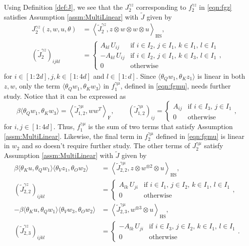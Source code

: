 \documentclass{article}
\begin{document}
\begin{appendices}
Using Definition \ref{def:J}, we see that the $J^{\gamma z}_2$ corresponding to $f^{\gamma z}_2$ in \eqref{eqn:fgz} satisfies Assumption \ref{assm:MultiLinear} with $\widetilde{J}$ given by
\begin{align*}
J^{\gamma z}_2(z,w,u,\theta) &= \left\langle \widetilde{J}_2^{\gamma z} ,z\otimes w\otimes w\otimes u\right\rangle_\mathrm{HS},\\ (\widetilde{J}_2^{\gamma z})_{ijkl} &= \begin{cases}
    A_{kl}\, U_{ij} & \text{if }i\in I_2,\, j\in I_1, \,k\in I_1,\, l\in I_1\\
    -A_{kl}\, U_{ij} & \text{if }i\in I_2,\, j\in I_1,\, k\in I_3,\, l\in I_1\\
    0 & \text{otherwise}
\end{cases},
\end{align*}
for $i\in[1:2d],j,k\in[1:4d]$ and $l\in[1:d]$. Since $\langle \theta_Q w_1,\theta_K z_1\rangle$ is linear in both $z,w$, only the term  $\langle \theta_Q w_1,\theta_Kw_3\rangle$ in $f_1^{\gamma\mu}$, defined in \eqref{eqn:fgmu}, needs further study. Notice that it can be expressed as 
\[
\beta\langle \theta_Q w_1,\theta_Kw_3\rangle = \left\langle \widetilde{J}^{\gamma\mu}_{1,2}, w w^T \right\rangle_\mathrm{F}, \qquad (\widetilde{J}_{1,2}^{\gamma \mu})_{ij} = \begin{cases}
    A_{ij} &\text{if }i\in I_3,\, j \in I_1\\
    0 & \text{otherwise}
\end{cases},
\]
for $i,j\in[1:4d]$. Thus, $f_1^{\gamma\mu}$ is the sum of two terms that satisfy Assumption \ref{assm:MultiLinear}. Likewise, the final term in $f_2^{\gamma\mu}$ defined in \eqref{eqn:fgmu} is linear in $w_2$ and so doesn't require further study. The other terms of $J_2^{\gamma\mu}$ satisfy Assumption \ref{assm:MultiLinear} with $\widetilde{J}$ given by 
\begin{align*}
        \beta\langle \theta_K u,\theta_Q w_1\rangle\langle \theta_V z_1, \theta_O w_2 \rangle &= \left\langle \widetilde{J}^{\gamma\mu}_{2,2}, z\otimes w^{\otimes 2}\otimes u\right\rangle_{\mathrm{HS}},\\ (\widetilde{J}_{2,2}^{\gamma z})_{ijkl} &= \begin{cases}
    A_{lk}\, U_{ji} & \text{if } i\in I_1,\, j\in I_2,\, k\in I_1,\, l\in I_1\\
    0 & \text{otherwise}
\end{cases},\\
        -\beta\langle \theta_K u,\theta_Q w_1\rangle\langle \theta_V w_3, \theta_O w_2 \rangle &= \left\langle \widetilde{J}^{\gamma\mu}_{2,3}, w^{\otimes 3}\otimes u\right\rangle_{\mathrm{HS}},\\ (\widetilde{J}_{2,3}^{\gamma z})_{ijkl} &= \begin{cases}
    -A_{lk}\, U_{ji} & \text{if } i\in I_3,\, j\in I_2,\, k\in I_1,\, l\in I_1\\
    0 & \text{otherwise}
\end{cases}.
\end{align*}


\end{appendices}
\end{document}
